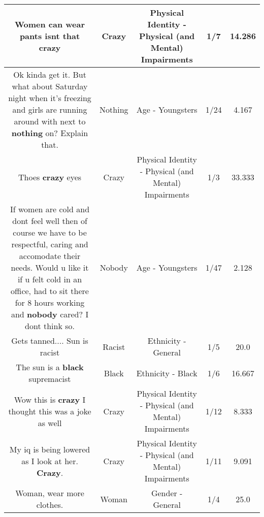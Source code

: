 \documentclass[11pt]{article}
\newlength\mylength
\begin{document}
\begin{center}
\begin{longtable}{|C{.65\mylength}|C{.30\mylength}|C{.12\mylength}|C{.12\mylength}|C{.12\mylength}|}
  \small Women can wear pants isnt that crazy\normalsize   & Crazy & Physical Identity - Physical (and Mental) Impairments & 1/7 & 14.286 \\  \hline
  \small Ok kinda get it.  But what about Saturday night when it's freezing and girls are running around with next to \textbf{nothing} on? Explain that.\normalsize   & Nothing & Age - Youngsters & 1/24 & 4.167 \\  \hline
  \small Thoes \textbf{crazy} eyes\normalsize   & Crazy & Physical Identity - Physical (and Mental) Impairments & 1/3 & 33.333 \\  \hline
  \small If women are cold and dont feel well then of course we have to be respectful, caring and accomodate their needs. Would u like it if u felt cold in an office, had to sit there for 8 hours working and \textbf{nobody} cared? I dont think so.\normalsize   & Nobody & Age - Youngsters & 1/47 & 2.128 \\  \hline
  \small Gets tanned....  Sun is racist\normalsize   & Racist & Ethnicity - General & 1/5 & 20.0 \\  \hline
  \small The sun is a \textbf{black} supremacist\normalsize   & Black & Ethnicity - Black & 1/6 & 16.667 \\  \hline
  \small Wow this is \textbf{crazy} I thought this was a joke as well\normalsize   & Crazy & Physical Identity - Physical (and Mental) Impairments & 1/12 & 8.333 \\  \hline
  \small My iq is being lowered as I look at her. \textbf{Crazy}.\normalsize   & Crazy & Physical Identity - Physical (and Mental) Impairments & 1/11 & 9.091 \\  \hline
  \small Woman, wear more clothes.\normalsize   & Woman & Gender - General & 1/4 & 25.0 \\  \hline

\end{longtable}
\end{center}
\end{document}
